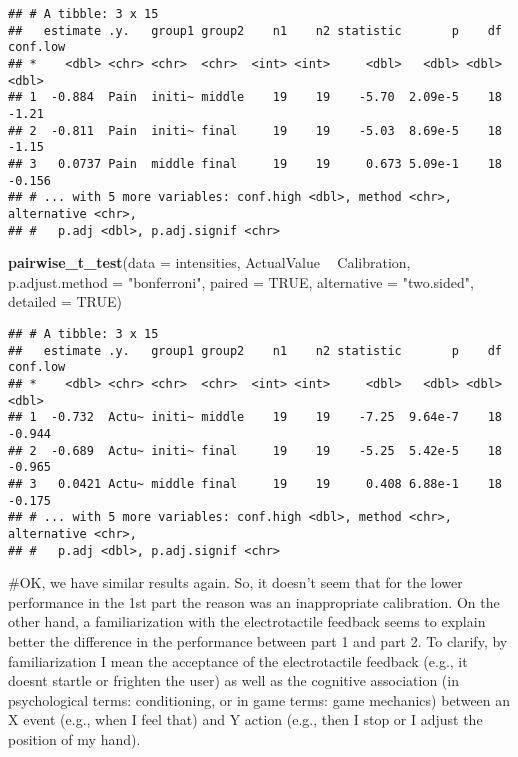 \documentclass[
]{article}
\newenvironment{Shaded}{\begin{snugshade}}{\end{snugshade}}
\newcommand{\DataTypeTok}[1]{\textcolor[rgb]{0.13,0.29,0.53}{#1}}
\newcommand{\KeywordTok}[1]{\textcolor[rgb]{0.13,0.29,0.53}{\textbf{#1}}}
\newcommand{\NormalTok}[1]{#1}
\newcommand{\OperatorTok}[1]{\textcolor[rgb]{0.81,0.36,0.00}{\textbf{#1}}}
\newcommand{\OtherTok}[1]{\textcolor[rgb]{0.56,0.35,0.01}{#1}}
\newcommand{\StringTok}[1]{\textcolor[rgb]{0.31,0.60,0.02}{#1}}
\begin{document}
\begin{verbatim}
## # A tibble: 3 x 15
##   estimate .y.   group1 group2    n1    n2 statistic       p    df conf.low
## *    <dbl> <chr> <chr>  <chr>  <int> <int>     <dbl>   <dbl> <dbl>    <dbl>
## 1  -0.884  Pain  initi~ middle    19    19    -5.70  2.09e-5    18   -1.21 
## 2  -0.811  Pain  initi~ final     19    19    -5.03  8.69e-5    18   -1.15 
## 3   0.0737 Pain  middle final     19    19     0.673 5.09e-1    18   -0.156
## # ... with 5 more variables: conf.high <dbl>, method <chr>, alternative <chr>,
## #   p.adj <dbl>, p.adj.signif <chr>
\end{verbatim}

\begin{Shaded}
\begin{Highlighting}[]
\KeywordTok{pairwise_t_test}\NormalTok{(}\DataTypeTok{data =}\NormalTok{ intensities, ActualValue }\OperatorTok{~}\StringTok{ }\NormalTok{Calibration, }\DataTypeTok{p.adjust.method =} \StringTok{"bonferroni"}\NormalTok{, }\DataTypeTok{paired =} \OtherTok{TRUE}\NormalTok{, }\DataTypeTok{alternative =} \StringTok{"two.sided"}\NormalTok{, }\DataTypeTok{detailed =} \OtherTok{TRUE}\NormalTok{)}
\end{Highlighting}
\end{Shaded}

\begin{verbatim}
## # A tibble: 3 x 15
##   estimate .y.   group1 group2    n1    n2 statistic       p    df conf.low
## *    <dbl> <chr> <chr>  <chr>  <int> <int>     <dbl>   <dbl> <dbl>    <dbl>
## 1  -0.732  Actu~ initi~ middle    19    19    -7.25  9.64e-7    18   -0.944
## 2  -0.689  Actu~ initi~ final     19    19    -5.25  5.42e-5    18   -0.965
## 3   0.0421 Actu~ middle final     19    19     0.408 6.88e-1    18   -0.175
## # ... with 5 more variables: conf.high <dbl>, method <chr>, alternative <chr>,
## #   p.adj <dbl>, p.adj.signif <chr>
\end{verbatim}

\#OK, we have similar results again. So, it doesn't seem that for the
lower performance in the 1st part the reason was an inappropriate
calibration. On the other hand, a familiarization with the
electrotactile feedback seems to explain better the difference in the
performance between part 1 and part 2. To clarify, by familiarization I
mean the acceptance of the electrotactile feedback (e.g., it doesnt
startle or frighten the user) as well as the cognitive association (in
psychological terms: conditioning, or in game terms: game mechanics)
between an X event (e.g., when I feel that) and Y action (e.g., then I
stop or I adjust the position of my hand).
\end{document}
